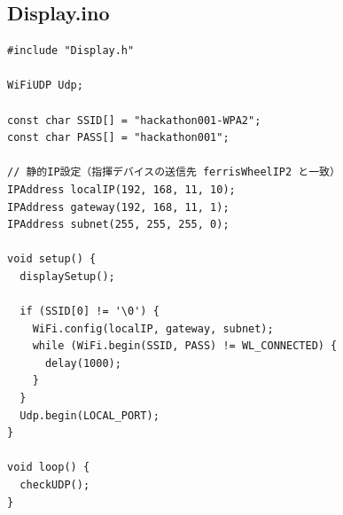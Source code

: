 \documentclass[uplatex,dvipdfmx,a4paper,11pt]{jsarticle}
\begin{document}
\subsection{Display.ino}
\begin{lstlisting}
#include "Display.h"

WiFiUDP Udp;

const char SSID[] = "hackathon001-WPA2";
const char PASS[] = "hackathon001";

// 静的IP設定（指揮デバイスの送信先 ferrisWheelIP2 と一致）
IPAddress localIP(192, 168, 11, 10);
IPAddress gateway(192, 168, 11, 1);
IPAddress subnet(255, 255, 255, 0);

void setup() {
  displaySetup();

  if (SSID[0] != '\0') {
    WiFi.config(localIP, gateway, subnet);
    while (WiFi.begin(SSID, PASS) != WL_CONNECTED) {
      delay(1000);
    }
  }
  Udp.begin(LOCAL_PORT);
}

void loop() {
  checkUDP();
}
\end{lstlisting}
\end{document}
